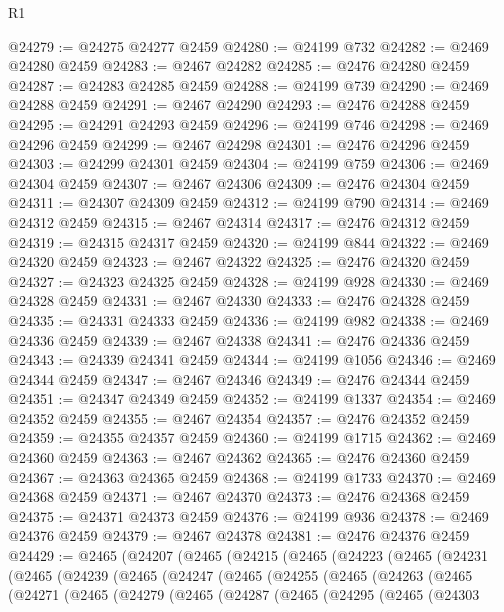\begin{lexlean}{R1}
\begin{coremodule}
@24279 := @24275 @24277 @2459
@24280 := @24199 @732
@24282 := @2469 @24280 @2459
@24283 := @2467 @24282
@24285 := @2476 @24280 @2459
@24287 := @24283 @24285 @2459
@24288 := @24199 @739
@24290 := @2469 @24288 @2459
@24291 := @2467 @24290
@24293 := @2476 @24288 @2459
@24295 := @24291 @24293 @2459
@24296 := @24199 @746
@24298 := @2469 @24296 @2459
@24299 := @2467 @24298
@24301 := @2476 @24296 @2459
@24303 := @24299 @24301 @2459
@24304 := @24199 @759
@24306 := @2469 @24304 @2459
@24307 := @2467 @24306
@24309 := @2476 @24304 @2459
@24311 := @24307 @24309 @2459
@24312 := @24199 @790
@24314 := @2469 @24312 @2459
@24315 := @2467 @24314
@24317 := @2476 @24312 @2459
@24319 := @24315 @24317 @2459
@24320 := @24199 @844
@24322 := @2469 @24320 @2459
@24323 := @2467 @24322
@24325 := @2476 @24320 @2459
@24327 := @24323 @24325 @2459
@24328 := @24199 @928
@24330 := @2469 @24328 @2459
@24331 := @2467 @24330
@24333 := @2476 @24328 @2459
@24335 := @24331 @24333 @2459
@24336 := @24199 @982
@24338 := @2469 @24336 @2459
@24339 := @2467 @24338
@24341 := @2476 @24336 @2459
@24343 := @24339 @24341 @2459
@24344 := @24199 @1056
@24346 := @2469 @24344 @2459
@24347 := @2467 @24346
@24349 := @2476 @24344 @2459
@24351 := @24347 @24349 @2459
@24352 := @24199 @1337
@24354 := @2469 @24352 @2459
@24355 := @2467 @24354
@24357 := @2476 @24352 @2459
@24359 := @24355 @24357 @2459
@24360 := @24199 @1715
@24362 := @2469 @24360 @2459
@24363 := @2467 @24362
@24365 := @2476 @24360 @2459
@24367 := @24363 @24365 @2459
@24368 := @24199 @1733
@24370 := @2469 @24368 @2459
@24371 := @2467 @24370
@24373 := @2476 @24368 @2459
@24375 := @24371 @24373 @2459
@24376 := @24199 @936
@24378 := @2469 @24376 @2459
@24379 := @2467 @24378
@24381 := @2476 @24376 @2459
@24429 := @2465
    (@24207
      (@2465
        (@24215
          (@2465
            (@24223
              (@2465
                (@24231
                  (@2465
                    (@24239
                      (@2465
                        (@24247
                          (@2465
                            (@24255
                              (@2465
                                (@24263
                                  (@2465
                                    (@24271
                                      (@2465
                                        (@24279
                                          (@2465
                                            (@24287
                                              (@2465
                                                (@24295
                                                  (@2465
                                                    (@24303

\end{coremodule}
\end{lexlean}
